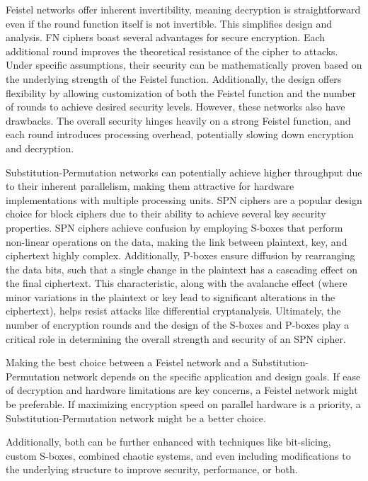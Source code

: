 \documentclass[conference]{IEEEtran}
\begin{document}
Feistel networks offer inherent invertibility, meaning decryption is straightforward even if the round function itself is not invertible. This simplifies design and analysis. FN ciphers boast several advantages for secure encryption. Each additional round improves the theoretical resistance of the cipher to attacks. Under specific assumptions, their security can be mathematically proven based on the underlying strength of the Feistel function. Additionally, the design offers flexibility by allowing customization of both the Feistel function and the number of rounds to achieve desired security levels. However, these networks also have drawbacks. The overall security hinges heavily on a strong Feistel function, and each round introduces processing overhead, potentially slowing down encryption and decryption.

Substitution-Permutation networks can potentially achieve higher throughput due to their inherent parallelism, making them attractive for hardware implementations with multiple processing units. SPN ciphers are a popular design choice for block ciphers due to their ability to achieve several key security properties.  SPN ciphers achieve confusion by employing S-boxes that perform non-linear operations on the data, making the link between plaintext, key, and ciphertext highly complex. Additionally, P-boxes ensure diffusion by rearranging the data bits, such that a single change in the plaintext has a cascading effect on the final ciphertext. This characteristic, along with the avalanche effect (where minor variations in the plaintext or key lead to significant alterations in the ciphertext), helps resist attacks like differential cryptanalysis. Ultimately, the number of encryption rounds and the design of the S-boxes and P-boxes play a critical role in determining the overall strength and security of an SPN cipher.

Making the best choice between a Feistel network and a Substitution-Permutation network depends on the specific application and design goals. If ease of decryption and hardware limitations are key concerns, a Feistel network might be preferable. If maximizing encryption speed on parallel hardware is a priority, a Substitution-Permutation network might be a better choice.

Additionally, both can be further enhanced with techniques like bit-slicing, custom S-boxes, combined chaotic systems, and even including modifications to the underlying structure to improve security, performance, or both.
\end{document}
